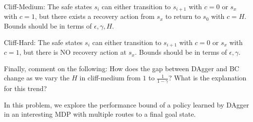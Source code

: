 \documentclass[11pt]{article}
\begin{document}
\noindent Cliff-Medium: The safe states $s_i$ can either transition to $s_{i+1}$ with $c = 0$ or $s_x$ with $c = 1$, but there exists a recovery action from $s_x$ to return to $s_0$ with $c = H$. Bounds should be in terms of $\epsilon, \gamma, H$.


\vskip 1.2in
\begin{figure}[h!]
\centering
{}
\end{figure}

\noindent Cliff-Hard: The safe states $s_i$ can either transition to $s_{i+1}$ with $c = 0$ or $s_x$ with $c = 1$, but there is NO recovery action at $s_x$. Bounds should be in terms of $\epsilon, \gamma$.


Finally, comment on the following: How does the gap between DAgger and BC change as we vary the $H$ in cliff-medium from $1$ to $\frac{1}{1-\gamma}$? What is the explanation for this trend?

\newpage







\noindent In this problem, we explore the performance bound of a policy learned by DAgger in an interesting MDP with multiple routes to a final goal state.
\end{document}
